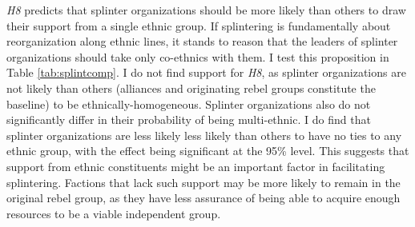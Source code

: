 \documentclass[12pt,]{book}
\theoremstyle{definition}
\theoremstyle{definition}
\theoremstyle{remark}
\begin{document}
\emph{H8} predicts that splinter organizations should be more likely
than others to draw their support from a single ethnic group. If
splintering is fundamentally about reorganization along ethnic lines, it
stands to reason that the leaders of splinter organizations should take
only co-ethnics with them. I test this proposition in Table
\ref{tab:splintcomp}. I do not find support for \emph{H8}, as splinter
organizations are not likely than others (alliances and originating
rebel groups constitute the baseline) to be ethnically-homogeneous.
Splinter organizations also do not significantly differ in their
probability of being multi-ethnic. I do find that splinter organizations
are less likely less likely than others to have no ties to any ethnic
group, with the effect being significant at the 95\% level. This
suggests that support from ethnic constituents might be an important
factor in facilitating splintering. Factions that lack such support may
be more likely to remain in the original rebel group, as they have less
assurance of being able to acquire enough resources to be a viable
independent group.
\end{document}
